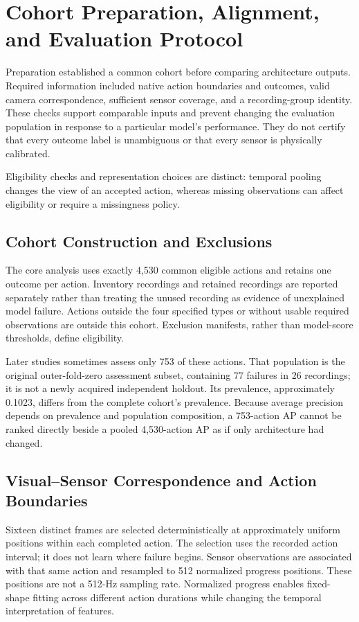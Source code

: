 \section{Cohort Preparation, Alignment, and Evaluation Protocol}
Preparation established a common cohort before comparing architecture outputs. Required
information included native action boundaries and outcomes, valid camera correspondence,
sufficient sensor coverage, and a recording-group identity. These checks support
comparable inputs and prevent changing the evaluation population in response to a
particular model's performance. They do not certify that every outcome label is
unambiguous or that every sensor is physically calibrated.

Eligibility checks and representation choices are distinct: temporal pooling changes the
view of an accepted action, whereas missing observations can affect eligibility or
require a missingness policy.

\subsection{Cohort Construction and Exclusions}
The core analysis uses exactly 4,530 common eligible actions and retains one outcome per
action. Inventory recordings and retained recordings are reported separately rather than
treating the unused recording as evidence of unexplained model failure. Actions outside
the four specified types or without usable required observations are outside this
cohort. Exclusion manifests, rather than model-score thresholds, define eligibility.

Later studies sometimes assess only 753 of these actions. That population is the
original outer-fold-zero assessment subset, containing 77 failures in 26 recordings; it
is not a newly acquired independent holdout. Its prevalence, approximately 0.1023,
differs from the complete cohort's prevalence. Because average precision depends on
prevalence and population composition, a 753-action AP cannot be ranked directly beside
a pooled 4,530-action AP as if only architecture had changed.

\subsection{Visual--Sensor Correspondence and Action Boundaries}
Sixteen distinct frames are selected deterministically at approximately uniform
positions within each completed action. The selection uses the recorded action interval;
it does not learn where failure begins. Sensor observations are associated with that
same action and resampled to 512 normalized progress positions. These positions are not
a 512-Hz sampling rate. Normalized progress enables fixed-shape fitting across different
action durations while changing the temporal interpretation of features.

